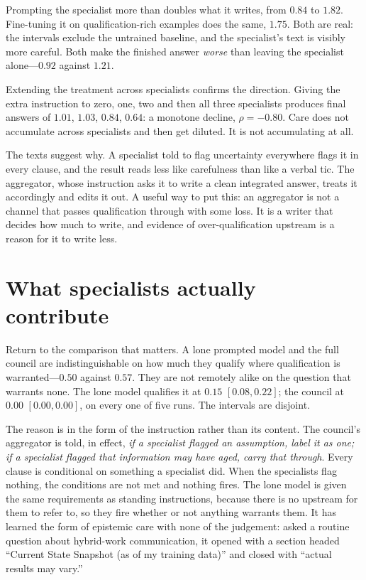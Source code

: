 \documentclass[11pt]{article}
\begin{document}
Prompting the specialist more than doubles what it writes, from $0.84$ to
$1.82$. Fine-tuning it on qualification-rich examples does the same, $1.75$.
Both are real: the intervals exclude the untrained baseline, and the
specialist's text is visibly more careful. Both make the finished answer
\emph{worse} than leaving the specialist alone---$0.92$ against $1.21$.

Extending the treatment across specialists confirms the direction. Giving the
extra instruction to zero, one, two and then all three specialists produces
final answers of $1.01$, $1.03$, $0.84$, $0.64$: a monotone decline,
$\rho = -0.80$. Care does not accumulate across specialists and then get
diluted. It is not accumulating at all.

The texts suggest why. A specialist told to flag uncertainty everywhere flags
it in every clause, and the result reads less like carefulness than like a
verbal tic. The aggregator, whose instruction asks it to write a clean
integrated answer, treats it accordingly and edits it out. A useful way to
put this: an aggregator is not a channel that passes qualification through
with some loss. It is a writer that decides how much to write, and evidence
of over-qualification upstream is a reason for it to write less.

\section{What specialists actually contribute}
Return to the comparison that matters. A lone prompted model and the full
council are indistinguishable on how much they qualify where qualification is
warranted---$0.50$ against $0.57$. They are not remotely alike on the question
that warrants none. The lone model qualifies it at $0.15$ $[0.08,0.22]$; the
council at $0.00$ $[0.00,0.00]$, on every one of five runs. The intervals are
disjoint.

The reason is in the form of the instruction rather than its content. The
council's aggregator is told, in effect, \emph{if a specialist flagged an
assumption, label it as one; if a specialist flagged that information may have
aged, carry that through}. Every clause is conditional on something a
specialist did. When the specialists flag nothing, the conditions are not met
and nothing fires. The lone model is given the same requirements as standing
instructions, because there is no upstream for them to refer to, so they fire
whether or not anything warrants them. It has learned the form of epistemic
care with none of the judgement: asked a routine question about hybrid-work
communication, it opened with a section headed ``Current State Snapshot (as of
my training data)'' and closed with ``actual results may vary.''
\end{document}
